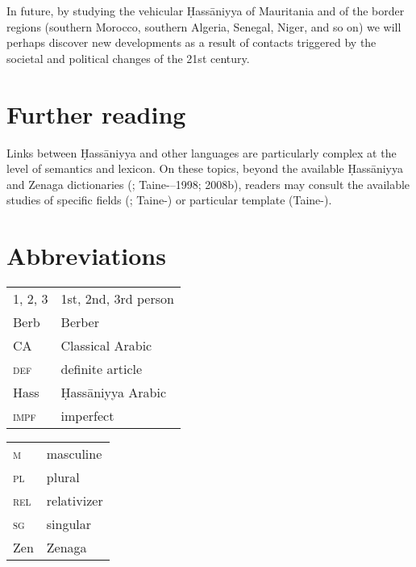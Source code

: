 \documentclass[output=paper]{langsci/langscibook}
\begin{document}
In future, by studying the vehicular Ḥassāniyya of Mauritania and of the border regions (southern Morocco, southern Algeria, Senegal, Niger, and so on) we will perhaps discover new developments as a result of contacts triggered by the societal and political changes of the 21st century. 

\section*{Further reading}

Links between Ḥassāniyya and other languages are particularly complex at the level of semantics and lexicon. On these topics, beyond the available Ḥassāniyya and Zenaga dictionaries (\citealt{Heath2004}; Taine-\citealt{Cheikh1988}–1998; 2008b), readers may consult the available studies of specific fields (\citealt{Monteil1952}; Taine-\citealt{Cheikh2013}) or particular template (Taine-\citealt{Cheikh2018b}).

\section*{Abbreviations}
\begin{tabularx}{.45\textwidth}{lQ}
\textsc{1, 2, 3} & 1st, 2nd, 3rd person \\
Berb            & Berber \\
CA           & Classical Arabic \\
\textsc{def}     & definite article \\
Hass           & Ḥassāniyya Arabic \\
\textsc{impf}   & imperfect \\
\end{tabularx}
\begin{tabularx}{.45\textwidth}{lQ}
\textsc{m}   & masculine\\
\textsc{pl}  & plural\\
\textsc{rel}     & relativizer\\
\textsc{sg}  & singular \\
Zen           & Zenaga \\
\end{tabularx}
 
\end{document}
